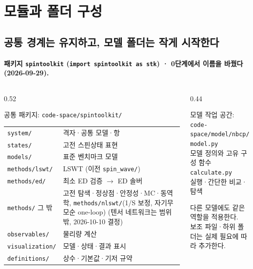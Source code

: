 
\section{모듈과 폴더 구성}



\subsection{공통 경계는 유지하고, 모델 폴더는 작게 시작한다}\label{folder-plan}
\begingroup%
  \framesubtitle{패키지 \texttt{spintoolkit} (\texttt{import spintoolkit as stk}) · 0단계에서 이름을 바꿨다(2026-09-29).}
  \begin{columns}[T,onlytextwidth]
    \begin{column}{0.52\textwidth}
      \begin{block}{공통 패키지: \texttt{code-space/spintoolkit/}}
        \small
        \begin{tabular}{@{}ll@{}}
          \texttt{system/} & 격자·공통 모델·항 \\
          \texttt{states/} & 고전 스핀상태 표현 \\
          \texttt{models/} & 표준 벤치마크 모델 \\
          \texttt{methods/lswt/} & LSWT (이전 \texttt{spin\_wave/}) \\
          \texttt{methods/ed/} & 최소 ED 검증 $\to$ ED 솔버 \\
          \texttt{methods/} 그 밖 & 고전 탐색·정상점·안정성·MC·동역학, \texttt{methods/nlswt/}(1/S 보정, 자기무모순 one-loop) (텐서 네트워크는 범위 밖, 2026-10-10 결정) \\
          \texttt{observables/} & 물리량 계산 \\
          \texttt{visualization/} & 모델·상태·결과 표시 \\
          \texttt{definitions/} & 상수·기본값·기저 규약
        \end{tabular}
      \end{block}
    \end{column}
    \begin{column}{0.44\textwidth}
      \begin{block}{모델 작업 공간: \texttt{code-space/model/nbcp/}}
        \texttt{model.py}\\
        모델 정의와 고유 구성 함수\\[0.8em]
        \texttt{calculate.py}\\
        실행·간단한 비교·탐색
      \end{block}
      \smallskip
      다른 모델에도 같은 역할을 적용한다.\\
      보조 파일·하위 폴더는 실제 필요에 따라 추가한다.
    \end{column}
  \end{columns}
